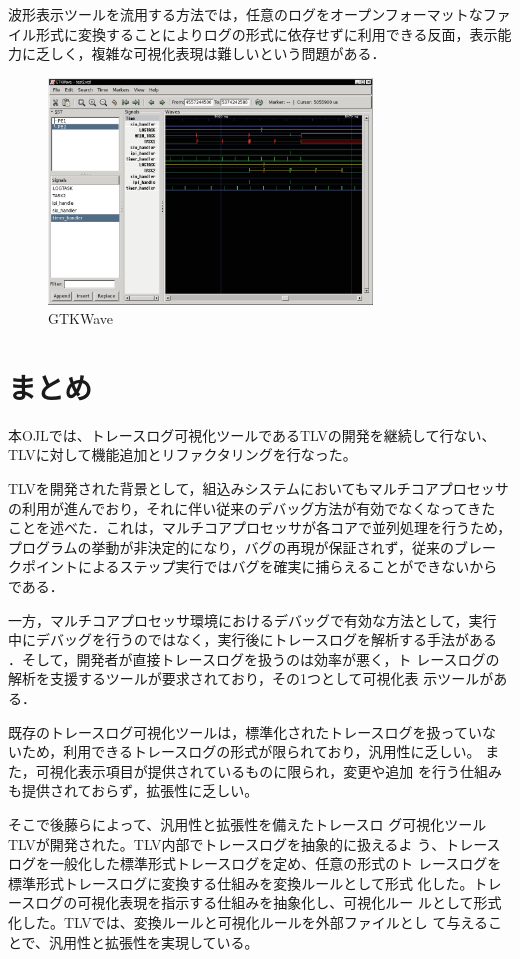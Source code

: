 波形表示ツールを流用する方法では，任意のログをオープンフォーマットなファイル形式に変換することによりログの形式に依存せずに利用できる反面，表示能力に乏しく，複雑な可視化表現は難しいという問題がある．

\begin{figure}
\begin{center}
\includegraphics[height=6cm]{GTKWave.eps}
\caption{GTKWave}
\label{fig:GTKWave}
\end{center}
\end{figure}

\section{まとめ}
本OJLでは、トレースログ可視化ツールであるTLVの開発を継続して行ない、
TLVに対して機能追加とリファクタリングを行なった。

TLVを開発された背景として，組込みシステムにおいてもマルチコアプロセッサ
の利用が進んでおり，それに伴い従来のデバッグ方法が有効でなくなってきた
ことを述べた．これは，マルチコアプロセッサが各コアで並列処理を行うため，
プログラムの挙動が非決定的になり，バグの再現が保証されず，従来のブレー
クポイントによるステップ実行ではバグを確実に捕らえることができないから
である．

一方，マルチコアプロセッサ環境におけるデバッグで有効な方法として，実行
中にデバッグを行うのではなく，実行後にトレースログを解析する手法がある
．そして，開発者が直接トレースログを扱うのは効率が悪く，ト
レースログの解析を支援するツールが要求されており，その1つとして可視化表
示ツールがある．

既存のトレースログ可視化ツールは，標準化されたトレースログを扱っていな
いため，利用できるトレースログの形式が限られており，汎用性に乏しい。
また，可視化表示項目が提供されているものに限られ，変更や追加
を行う仕組みも提供されておらず，拡張性に乏しい。

そこで後藤ら\cite{goto,ipsj}によって、汎用性と拡張性を備えたトレースロ
グ可視化ツールTLVが開発された。TLV内部でトレースログを抽象的に扱えるよ
う、トレースログを一般化した標準形式トレースログを定め、任意の形式のト
レースログを標準形式トレースログに変換する仕組みを変換ルールとして形式
化した。トレースログの可視化表現を指示する仕組みを抽象化し、可視化ルー
ルとして形式化した。TLVでは、変換ルールと可視化ルールを外部ファイルとし
て与えることで、汎用性と拡張性を実現している。

